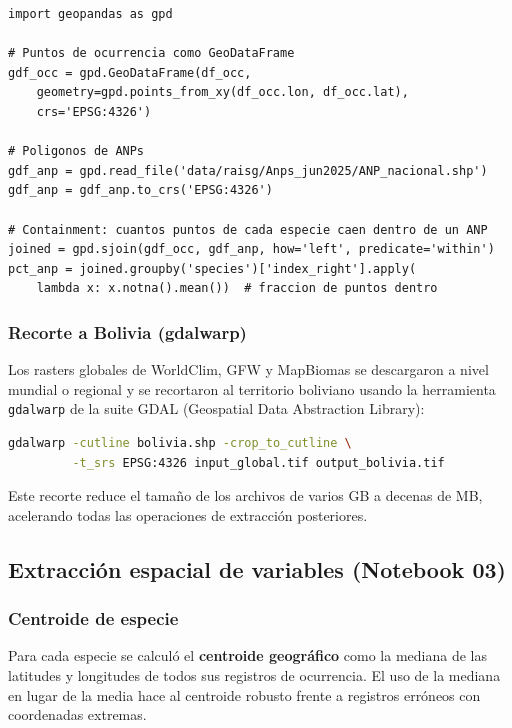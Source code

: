\documentclass[12pt,a4paper]{article}
\begin{document}
\begin{samepage}
\begin{lstlisting}[caption={Operación espacial: porcentaje de ocurrencias dentro de ANPs.}]
import geopandas as gpd

# Puntos de ocurrencia como GeoDataFrame
gdf_occ = gpd.GeoDataFrame(df_occ,
    geometry=gpd.points_from_xy(df_occ.lon, df_occ.lat),
    crs='EPSG:4326')

# Poligonos de ANPs
gdf_anp = gpd.read_file('data/raisg/Anps_jun2025/ANP_nacional.shp')
gdf_anp = gdf_anp.to_crs('EPSG:4326')

# Containment: cuantos puntos de cada especie caen dentro de un ANP
joined = gpd.sjoin(gdf_occ, gdf_anp, how='left', predicate='within')
pct_anp = joined.groupby('species')['index_right'].apply(
    lambda x: x.notna().mean())  # fraccion de puntos dentro
\end{lstlisting}
\end{samepage}

\subsubsection{Recorte a Bolivia (gdalwarp)}

Los rasters globales de WorldClim, GFW y MapBiomas se descargaron a nivel mundial o
regional y se recortaron al territorio boliviano usando la herramienta \texttt{gdalwarp}
de la suite GDAL (Geospatial Data Abstraction Library):

\begin{lstlisting}[caption={Recorte de raster a Bolivia con gdalwarp.},language=bash]
gdalwarp -cutline bolivia.shp -crop_to_cutline \
         -t_srs EPSG:4326 input_global.tif output_bolivia.tif
\end{lstlisting}

Este recorte reduce el tamaño de los archivos de varios GB a decenas de MB,
acelerando todas las operaciones de extracción posteriores.

\subsection{Extracción espacial de variables (Notebook 03)}

\subsubsection{Centroide de especie}

Para cada especie se calculó el \textbf{centroide geográfico} como la mediana de las latitudes
y longitudes de todos sus registros de ocurrencia.  El uso de la mediana en lugar de la media
hace al centroide robusto frente a registros erróneos con coordenadas extremas.
\end{document}
